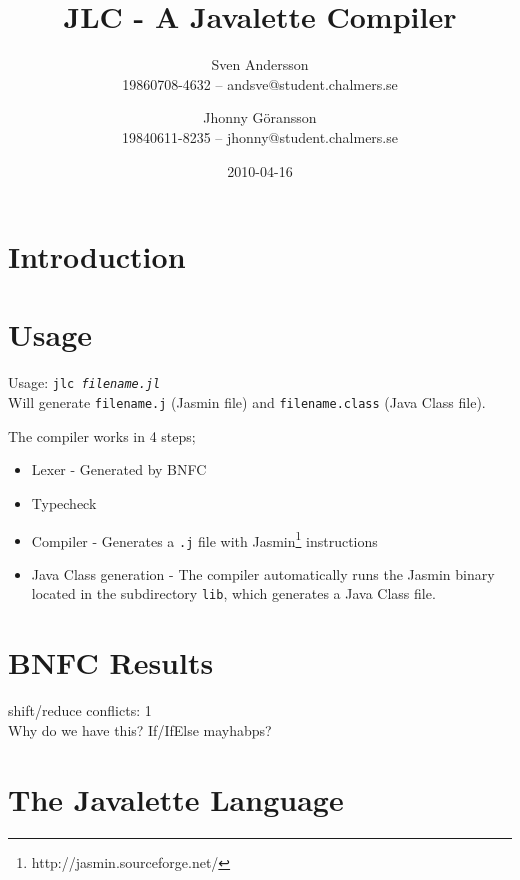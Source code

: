 \documentclass[]{article}
\title{JLC - A Javalette Compiler}
\author{Sven Andersson\\19860708-4632 -- andsve@student.chalmers.se
        \and Jhonny Göransson\\19840611-8235 -- jhonny@student.chalmers.se}
\date{2010-04-16}
\begin{document}
\ifpdf
{}
\else
{}
\fi

\maketitle



\section{Introduction}

\section{Usage}
  Usage: \texttt{jlc \textit{filename.jl}}\\
  Will generate \texttt{filename.j} (Jasmin file) and \texttt{filename.class} (Java Class file).
  
  The compiler works in 4 steps;
  \begin{itemize}
    \item Lexer - Generated by BNFC
    \item Typecheck
    \item Compiler - Generates a \texttt{.j} file with Jasmin\footnote{http://jasmin.sourceforge.net/} instructions
    \item Java Class generation - The compiler automatically runs the Jasmin binary located in the subdirectory \texttt{lib}, which generates a Java Class file.
  \end{itemize}

\section{BNFC Results}
  shift/reduce conflicts:  1\\
  Why do we have this? If/IfElse mayhabps?

\section{The Javalette Language}




\end{document}
